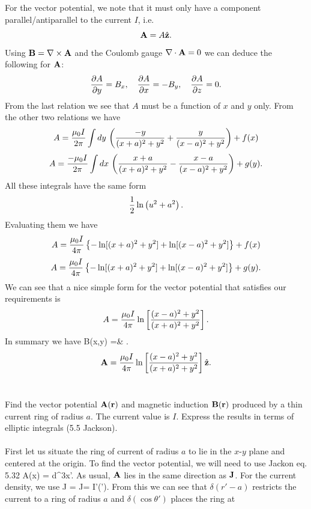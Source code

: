 \documentclass[11pt,letterpaper]{article}
\begin{document}
	For the vector potential, we note that it must only have a component parallel/antiparallel to the current $I$, i.e. 
	\[
		\vect A = A \vecth z.
	\]
	Using $\vect B = \del\times \vect A$ and the Coulomb gauge $\del\cdot \vect A = 0$ we can deduce the following for $\vect A$:
	\[
		\pdiff[A]{y} = B_x,\quad \pdiff[A]{x} = -B_y,\quad \pdiff[A]{z} = 0.
	\]
	From the last relation we see that $A$ must be a function of $x$ and $y$ only. From the other two relations we have
	\[
		A = \frac{\mu_0 I}{2\pi} \int dy\, \plr{\frac{-y}{(x+a)^2+y^2}+\frac{y}{(x-a)^2+y^2}} + f(x)
	\]
	\[
		A = \frac{-\mu_0 I}{2\pi} \int dx\, \plr{\frac{x+a}{(x+a)^2+y^2}-\frac{x-a}{(x-a)^2+y^2}} + g(y).
	\]
	All these integrals have the same form
	\[
		\frac{1}{2} \ln\plr{u^2+a^2}.
	\]
	Evaluating them we have
	\[
		A = \frac{\mu_0 I}{4\pi}\clr{-\ln[(x+a)^2+y^2]+\ln[(x-a)^2+y^2]} + f(x)
	\]
	\[
		A = \frac{\mu_0 I}{4\pi}\clr{-\ln[(x+a)^2+y^2]+\ln[(x-a)^2+y^2]} + g(y) .
	\]
	We can see that a nice simple form for the vector potential that satisfies our requirements is
	\[
		A = \frac{\mu_0 I}{4\pi}\ln\blr{\frac{(x-a)^2+y^2}{(x+a)^2+y^2}}.
	\]
	In summary we have
	\ba
		\vect B(x,y) =& .
	\ea
	\[
		\vect A = \frac{\mu_0 I}{4\pi}\ln\blr{\frac{(x-a)^2+y^2}{(x+a)^2+y^2}}\vecth z.
	\]
	\\
	\item
	Find the vector potential $\vect A(\vect r)$ and magnetic induction $\vect B(\vect r)$ produced by a thin current ring of radius
	$a$. The current value is $I$. Express the results in terms of elliptic integrals (5.5 Jackson).
	\\
	\\
	First let us situate the ring of current of radius $a$ to lie in the $x$-$y$ plane and centered at the origin. To find the vector
	potential, we will need to use Jackon eq. 5.32
	\be\label{7}
		\vect A(\vect x) = \int {}d^3x'.
	\ee
	As usual, $\vect A$ lies in the same direction as $\vect J$. For the current density, we use
	\be\label{8}
		\vect J = J\vecth \phi = I\sin\theta'\delta(\cos\theta')\vecth \phi.
	\ee
	From this we can see that $\delta(r'-a)$ restricts the current to a ring of radius $a$ and $\delta(\cos\theta')$ places the ring at 
\end{document}
